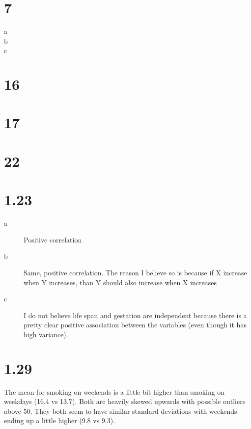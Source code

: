 \documentclass[12pt]{article}
\begin{document}
\section*{7}
\begin{description}
\item[a]
\item[b]
\item[c]
\end{description}

\section*{16}
\section*{17}
\section*{22}

\section*{1.23}
\begin{description}
\item[a] Positive correlation
\item[b] Same, positive correlation. The reason I believe so is because if X
    increase when Y increases, than Y should also increase when X increases
\item[c] I do not believe life span and gestation are independent because there
    is a pretty clear positive association between the variables (even though
    it has high variance).
\end{description}

\section*{1.29}
The mean for smoking on weekends is a little bit higher than smoking on weekdays
(16.4 vs 13.7). Both are heavily skewed upwards with possible outliers above 50. %
They both seem to have similar standard deviations with weekends ending up a 
little higher (9.8 vs 9.3).
\end{document}
